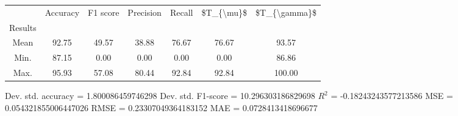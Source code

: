 \begin{tabular}{|c|c|c|c|c|c|c|}
\toprule
{} &  Accuracy &  F1 score &  Precision &  Recall &  \$T\_\{\textbackslash mu\}\$ &  \$T\_\{\textbackslash gamma\}\$ \\
Results &           &           &            &         &            &               \\
\hline
Mean    &     92.75 &     49.57 &      38.88 &   76.67 &      76.67 &         93.57 \\
Min.    &     87.15 &      0.00 &       0.00 &    0.00 &       0.00 &         86.86 \\
Max.    &     95.93 &     57.08 &      80.44 &   92.84 &      92.84 &        100.00 \\
\bottomrule
\end{tabular}

 Dev. std. accuracy = 1.800086459746298
 Dev. std. F1-score = 10.296303186829698
 $R^2$ = -0.18243243577213586
 MSE = 0.054321855006447026
 RMSE = 0.23307049364183152
 MAE = 0.0728413418696677